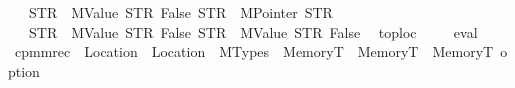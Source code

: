 \begin{isabellebody}
\ \ \ {\isacharparenleft}{\kern0pt}STR\ {\isacharprime}{\kern0pt}{\isacharprime}{\kern0pt}{}{\isachardot}{\kern0pt}{}{\isachardot}{\kern0pt}{}{\isacharprime}{\kern0pt}{\isacharprime}{\kern0pt}{\isacharcomma}{\kern0pt}\ MValue\ STR\ {\isacharprime}{\kern0pt}{\isacharprime}{\kern0pt}False{\isacharprime}{\kern0pt}{\isacharprime}{\kern0pt}{\isacharparenright}{\kern0pt}{\isacharcomma}{\kern0pt}\ {\isacharparenleft}{\kern0pt}STR\ {\isacharprime}{\kern0pt}{\isacharprime}{\kern0pt}{}{\isachardot}{\kern0pt}{}{\isacharprime}{\kern0pt}{\isacharprime}{\kern0pt}{\isacharcomma}{\kern0pt}\ MPointer\ STR\ {\isacharprime}{\kern0pt}{\isacharprime}{\kern0pt}{}{\isachardot}{\kern0pt}{}{\isacharprime}{\kern0pt}{\isacharprime}{\kern0pt}{\isacharparenright}{\kern0pt}{\isacharcomma}{\kern0pt}\isanewline
\ \ \ {\isacharparenleft}{\kern0pt}STR\ {\isacharprime}{\kern0pt}{\isacharprime}{\kern0pt}{}{\isachardot}{\kern0pt}{}{\isachardot}{\kern0pt}{}{\isacharprime}{\kern0pt}{\isacharprime}{\kern0pt}{\isacharcomma}{\kern0pt}\ MValue\ STR\ {\isacharprime}{\kern0pt}{\isacharprime}{\kern0pt}False{\isacharprime}{\kern0pt}{\isacharprime}{\kern0pt}{\isacharparenright}{\kern0pt}{\isacharcomma}{\kern0pt}\ {\isacharparenleft}{\kern0pt}STR\ {\isacharprime}{\kern0pt}{\isacharprime}{\kern0pt}{}{\isachardot}{\kern0pt}{}{\isachardot}{\kern0pt}{}{\isacharprime}{\kern0pt}{\isacharprime}{\kern0pt}{\isacharcomma}{\kern0pt}\ MValue\ STR\ {\isacharprime}{\kern0pt}{\isacharprime}{\kern0pt}False{\isacharprime}{\kern0pt}{\isacharprime}{\kern0pt}{\isacharparenright}{\kern0pt}{\isacharbrackright}{\kern0pt}{\isacharcomma}{\kern0pt}\isanewline
\ \ toploc\ {\isacharequal}{\kern0pt}\ {}{\isasymrparr}{\isachardoublequoteclose}%
\isadelimproof
\ %
\endisadelimproof
%
\isatagproof
{}\isamarkupfalse%
\ eval%
\endisatagproof
{\isafoldproof}%
%
\isadelimproof
%
\endisadelimproof
%
\isadelimdocument
%
\endisadelimdocument
%
\isatagdocument
%
\isamarkuptrue%
%
\isamarkuptrue%
%
\endisatagdocument
{\isafolddocument}%
%
\isadelimdocument
%
\endisadelimdocument
{}\isamarkupfalse%
\ cpm{}mrec\ {\isacharcolon}{\kern0pt}{\isacharcolon}{\kern0pt}\ {\isachardoublequoteopen}Location\ {\isasymRightarrow}\ Location\ {\isasymRightarrow}\ MTypes\ {\isasymRightarrow}\ MemoryT\ {\isasymRightarrow}\ MemoryT\ {\isasymRightarrow}\ MemoryT\ option{\isachardoublequoteclose}\isanewline

\end{isabellebody}
